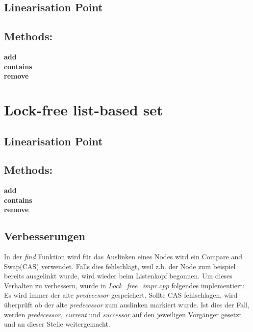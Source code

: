 \documentclass[10pt,a4paper,titlepage,oneside]{article}
\begin{document}
\subsection{Linearisation Point}

\subsection{Methods:}
\textbf{add}\\
\textbf{contains}\\
\textbf{remove}

\section{Lock-free list-based set}

\subsection{Linearisation Point}

\subsection{Methods:}
\textbf{add}\\
\textbf{contains}\\
\textbf{remove}



\subsection{Verbesserungen}
In der \textit{find} Funktion wird für das Auslinken eines Nodes wird ein Compare and Swap(CAS) verwendet. Falls dies fehlschlägt, 
weil z.b. der Node zum beispiel bereits ausgelinkt wurde,
wird wieder beim Listenkopf begonnen. Um dieses Verhalten zu verbessern, wurde in \textit{Lock\_free\_impr.cpp} folgendes implementiert:\\
Es wird immer der alte \textit{predecessor} gespeichert. Sollte CAS fehlschlagen, wird überprüft ob der alte \textit{predecessor}
zum auslinken markiert wurde. Ist dies der Fall, werden \textit{predecessor, current} und \textit{successor} auf den jeweiligen Vorgänger
gesetzt und an dieser Stelle weitergemacht. 

 
 

	


		
\end{document}
